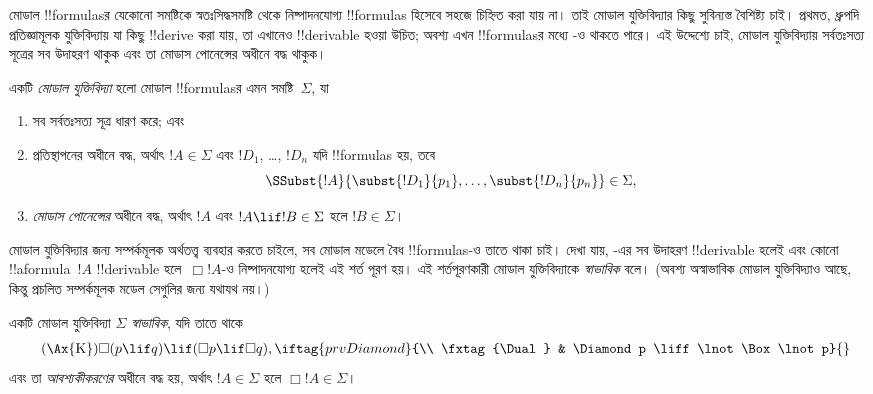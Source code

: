 \documentclass[../../../include/open-logic-section]{subfiles}
\begin{document}


মোডাল !!{formula}sর যেকোনো সমষ্টিকে স্বতঃসিদ্ধসমষ্টি থেকে নিষ্পাদনযোগ্য !!{formula}s হিসেবে সহজে চিহ্নিত করা যায় না। তাই মোডাল যুক্তিবিদ্যার কিছু সুবিন্যস্ত বৈশিষ্ট্য চাই। প্রথমত, ধ্রুপদি প্রতিজ্ঞামূলক যুক্তিবিদ্যায় যা কিছু !!{derive} করা যায়, তা এখানেও !!{derivable} হওয়া উচিত; অবশ্য এখন !!{formula}sর মধ্যে -ও থাকতে পারে। এই উদ্দেশ্যে চাই, মোডাল যুক্তিবিদ্যায় সর্বতঃসত্য সূত্রের সব উদাহরণ থাকুক এবং তা মোডাস পোনেন্সের অধীনে বদ্ধ থাকুক।

\begin{defn}
  একটি \emph{মোডাল যুক্তিবিদ্যা} হলো মোডাল !!{formula}sর এমন সমষ্টি~$\Sigma$, যা
  \begin{enumerate}
  \item সব সর্বতঃসত্য সূত্র ধারণ করে; এবং
  \item প্রতিস্থাপনের অধীনে বদ্ধ, অর্থাৎ $!A \in \Sigma$ এবং $!D_1$, \dots, $!D_n$ যদি !!{formula}s হয়, তবে
    \[
    \SSubst{!A}{\subst{!D_1}{p_1}, \dots, \subst{!D_n}{p_n}} \in \Sigma,
    \]
    \item \emph{মোডাস পোনেন্সের} অধীনে বদ্ধ, অর্থাৎ $!A$ এবং $!A
      \lif !B \in \Sigma$ হলে $!B \in \Sigma$।
  \end{enumerate}
\end{defn}

মোডাল যুক্তিবিদ্যার জন্য সম্পর্কমূলক অর্থতত্ত্ব ব্যবহার করতে চাইলে, সব মোডাল মডেলে বৈধ !!{formula}s-ও তাতে থাকা চাই। দেখা যায়, -এর সব উদাহরণ !!{derivable} হলেই এবং কোনো !!a{formula}~$!A$ !!{derivable} হলে~$\Box !A$-ও নিষ্পাদনযোগ্য হলেই এই শর্ত পূরণ হয়। এই শর্তপূরণকারী মোডাল যুক্তিবিদ্যাকে \emph{স্বাভাবিক} বলে। (অবশ্য অস্বাভাবিক মোডাল যুক্তিবিদ্যাও আছে, কিন্তু প্রচলিত সম্পর্কমূলক মডেল সেগুলির জন্য যথাযথ নয়।)

\begin{defn}
  একটি মোডাল যুক্তিবিদ্যা $\Sigma$ \emph{স্বাভাবিক}, যদি তাতে থাকে
  \begin{align*}
    \tag{\Ax{K}} & \Box(p \lif q) \lif (\Box p \lif \Box q),
    \iftag{prvDiamond}{\\
      \tag{\Dual} & \Diamond p \liff \lnot\Box\lnot p}{}
  \end{align*}
  এবং তা \emph{আবশ্যকীকরণের} অধীনে বদ্ধ হয়, অর্থাৎ $!A \in
  \Sigma$ হলে $\Box !A \in \Sigma$।
\end{defn}
\end{document}
